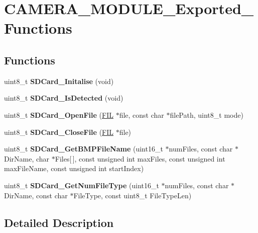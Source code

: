 \hypertarget{group___c_a_m_e_r_a___m_o_d_u_l_e___exported___functions}{}\section{C\+A\+M\+E\+R\+A\+\_\+\+M\+O\+D\+U\+L\+E\+\_\+\+Exported\+\_\+\+Functions}
\label{group___c_a_m_e_r_a___m_o_d_u_l_e___exported___functions}
\subsection*{Functions}
\begin{DoxyCompactItemize}
\item 
\mbox{\label{group___c_a_m_e_r_a___m_o_d_u_l_e___exported___functions_ga67d24fe1c8fc3857820722e1f72350e0}} 
uint8\+\_\+t {\bfseries S\+D\+Card\+\_\+\+Initalise} (void)
\item 
\mbox{\label{group___c_a_m_e_r_a___m_o_d_u_l_e___exported___functions_ga67ae8af16e8ce41e6965c72bec56a547}} 
uint8\+\_\+t {\bfseries S\+D\+Card\+\_\+\+Is\+Detected} (void)
\item 
\mbox{\label{group___c_a_m_e_r_a___m_o_d_u_l_e___exported___functions_ga6d13327e38d90e8a24fe691c3a8f11ac}} 
uint8\+\_\+t {\bfseries S\+D\+Card\+\_\+\+Open\+File} (\hyperlink{struct_f_i_l}{F\+IL} $\ast$file, const char $\ast$file\+Path, uint8\+\_\+t mode)
\item 
\mbox{\label{group___c_a_m_e_r_a___m_o_d_u_l_e___exported___functions_gabc2c13ff7f461c265d71cbafa5e1366f}} 
uint8\+\_\+t {\bfseries S\+D\+Card\+\_\+\+Close\+File} (\hyperlink{struct_f_i_l}{F\+IL} $\ast$file)
\item 
\mbox{\label{group___c_a_m_e_r_a___m_o_d_u_l_e___exported___functions_ga85066324178d7c7ca0de7182bbe9e603}} 
uint8\+\_\+t {\bfseries S\+D\+Card\+\_\+\+Get\+B\+M\+P\+File\+Name} (uint16\+\_\+t $\ast$num\+Files, const char $\ast$Dir\+Name, char $\ast$Files\mbox{[}$\,$\mbox{]}, const unsigned int max\+Files, const unsigned int max\+File\+Name, const unsigned int start\+Index)
\item 
\mbox{\label{group___c_a_m_e_r_a___m_o_d_u_l_e___exported___functions_ga8acfb5338f17444e1ba8f51234cc0c5e}} 
uint8\+\_\+t {\bfseries S\+D\+Card\+\_\+\+Get\+Num\+File\+Type} (uint16\+\_\+t $\ast$num\+Files, const char $\ast$Dir\+Name, const char $\ast$File\+Type, const uint8\+\_\+t File\+Type\+Len)
\end{DoxyCompactItemize}


\subsection{Detailed Description}
